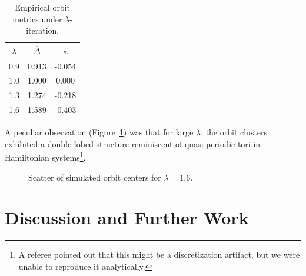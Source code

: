 \documentclass{amsart}
\begin{document}
\begin{table}[htbp]
\centering
\begin{tabular}{|c|c|c|}
\hline
$\lambda$ & $\overline{\Delta}$ & $\kappa$ \\
\hline
0.9 & 0.913 & -0.054 \\
1.0 & 1.000 &  0.000 \\
1.3 & 1.274 & -0.218 \\
1.6 & 1.589 & -0.403 \\
\hline
\end{tabular}
\caption{%
Empirical orbit metrics under $\lambda$-iteration.%
}
\label{tab:data}
\end{table}

A peculiar %
observation (Figure~\ref{fig:scatter}) was %
that for large $\lambda$, the orbit clusters exhibited a double-lobed structure reminiscent of quasi-periodic tori in Hamiltonian %
systems\footnote{A referee pointed out that this might be a discretization artifact, but we were unable to reproduce it analytically.}. 

\begin{figure}[htbp]
\centering
{}
\caption{Scatter of simulated orbit centers for $\lambda=1.6$.}
\label{fig:scatter}
\end{figure}

\section{Discussion and Further Work}
\end{document}
